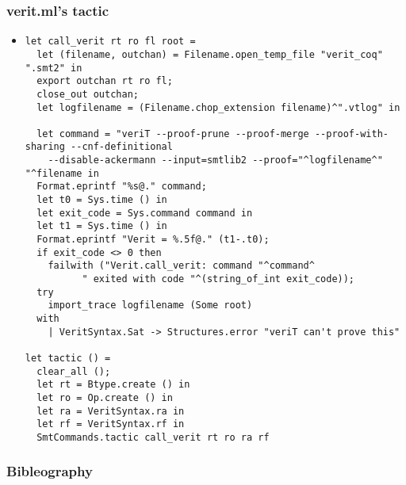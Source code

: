 \documentclass{beamer}
\begin{document}
\begin{frame}[fragile]
\frametitle{verit.ml's tactic}
\begin{itemize}
\item
\begin{Verbatim}[fontsize=\tiny]
let call_verit rt ro fl root =
  let (filename, outchan) = Filename.open_temp_file "verit_coq" ".smt2" in
  export outchan rt ro fl;
  close_out outchan;
  let logfilename = (Filename.chop_extension filename)^".vtlog" in

  let command = "veriT --proof-prune --proof-merge --proof-with-sharing --cnf-definitional
    --disable-ackermann --input=smtlib2 --proof="^logfilename^" "^filename in
  Format.eprintf "%s@." command;
  let t0 = Sys.time () in
  let exit_code = Sys.command command in
  let t1 = Sys.time () in
  Format.eprintf "Verit = %.5f@." (t1-.t0);
  if exit_code <> 0 then
    failwith ("Verit.call_verit: command "^command^
          " exited with code "^(string_of_int exit_code));
  try
    import_trace logfilename (Some root)
  with
    | VeritSyntax.Sat -> Structures.error "veriT can't prove this"

let tactic () =
  clear_all ();
  let rt = Btype.create () in
  let ro = Op.create () in
  let ra = VeritSyntax.ra in
  let rf = VeritSyntax.rf in
  SmtCommands.tactic call_verit rt ro ra rf

\end{Verbatim}
\end{itemize}
\end{frame}


\begin{frame}[fragile]
\frametitle{Bibleography}
\end{frame}
\end{document}
